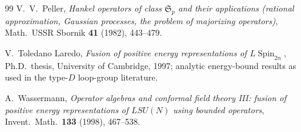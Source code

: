 \documentclass[11pt]{article}
\theoremstyle{remark}
\begin{document}
\begin{thebibliography}{99}
V.~V.~Peller,
\emph{Hankel operators of class $\mathfrak S_p$ and their applications
(rational approximation, Gaussian processes, the problem of majorizing
operators)},
Math.\ USSR Sbornik \textbf{41} (1982), 443--479.

V.~Toledano Laredo,
\emph{Fusion of positive energy representations of $L\operatorname{Spin}_{2n}$},
Ph.D.\ thesis, University of Cambridge, 1997; analytic energy-bound
results as used in the type-$D$ loop-group literature.

A.~Wassermann,
\emph{Operator algebras and conformal field theory III: fusion of
positive energy representations of $LSU(N)$ using bounded operators},
Invent.\ Math.\ \textbf{133} (1998), 467--538.

\end{thebibliography}
\end{document}
